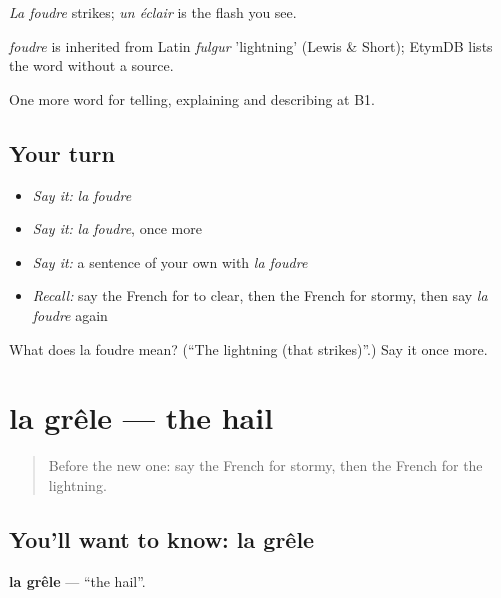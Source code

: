 \emph{La foudre} strikes; \emph{un éclair} is the flash you see.

\begin{cousinweb}
\emph{foudre} is inherited from Latin \emph{fulgur} 'lightning' (Lewis \& Short); EtymDB lists the word without a source.
\end{cousinweb}

\begin{grammarlens}[title={What you've built}]
One more word for telling, explaining and describing at B1.
\end{grammarlens}

\subsection*{Your turn}
\begin{itemize}
\raggedright
  \item \emph{Say it:} \emph{la foudre}
  \item \emph{Say it:} \emph{la foudre}, once more
  \item \emph{Say it:} a sentence of your own with \emph{la foudre}
  \item \emph{Recall:} say the French for to clear, then the French for stormy, then say \emph{la foudre} again
\end{itemize}

\begin{tcolorbox}[breakable,colback=teal!4,colframe=teal!35!black,title={Before you move on}]
What does la foudre mean? (\textquotedblleft{}The lightning (that strikes)\textquotedblright{}.) Say it once more.
\end{tcolorbox}
\section[la grêle]{la grêle — the hail}

\label{lesson:FR-C462-grele}



\begin{quote}
Before the new one: say the French for stormy, then the French for the lightning.
\end{quote}

\subsection*{You'll want to know: la grêle}
\textbf{la grêle} — \textquotedblleft{}the hail\textquotedblright{}.


